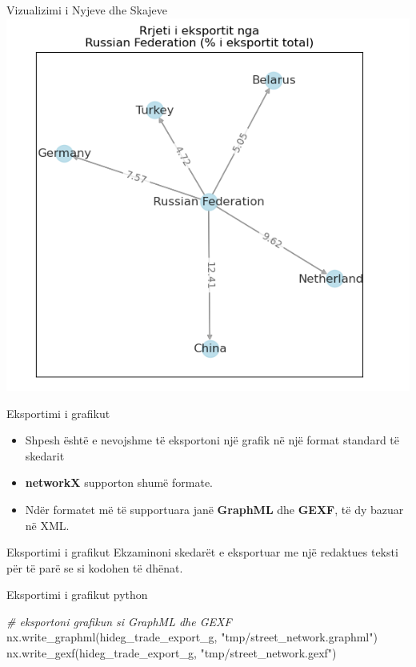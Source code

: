 \documentclass[
  ignorenonframetext,
]{beamer}
\newenvironment{Shaded}{\begin{snugshade}}{\end{snugshade}}
\newcommand{\CommentTok}[1]{\textcolor[rgb]{0.56,0.35,0.01}{\textit{#1}}}
\newcommand{\NormalTok}[1]{#1}
\newcommand{\StringTok}[1]{\textcolor[rgb]{0.31,0.60,0.02}{#1}}
\begin{document}
\begin{frame}{Vizualizimi i Nyjeve dhe Skajeve}
\protect\hypertarget{vizualizimi-i-nyjeve-dhe-skajeve-10}{}
\includegraphics{./Figs/difrrjet3.png}
\end{frame}

\begin{frame}{Eksportimi i grafikut}
\protect\hypertarget{eksportimi-i-grafikut}{}
\begin{itemize}
\item
  Shpesh është e nevojshme të eksportoni një grafik në një format
  standard të skedarit
\item
  \textbf{networkX} supporton shumë formate.
\item
  Ndër formatet më të supportuara janë \textbf{GraphML} dhe
  \textbf{GEXF}, të dy bazuar në XML.
\end{itemize}
\end{frame}

\begin{frame}{Eksportimi i grafikut}
\protect\hypertarget{eksportimi-i-grafikut-1}{}
Ekzaminoni skedarët e eksportuar me një redaktues teksti për të parë se
si kodohen të dhënat.
\end{frame}

\begin{frame}[fragile]{Eksportimi i grafikut}
\protect\hypertarget{eksportimi-i-grafikut-2}{}
python

\begin{Shaded}
\begin{Highlighting}[]
\CommentTok{\# eksportoni grafikun si GraphML dhe GEXF}
\NormalTok{nx.write\_graphml(hideg\_trade\_export\_g, }\StringTok{"tmp/street\_network.graphml"}\NormalTok{)}
\NormalTok{nx.write\_gexf(hideg\_trade\_export\_g, }\StringTok{"tmp/street\_network.gexf"}\NormalTok{)}
\end{Highlighting}
\end{Shaded}
\end{frame}
\end{document}
